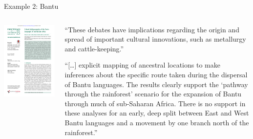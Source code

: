 \documentclass[9pt]{beamer}
\begin{document}
\begin{frame}{Example 2: Bantu}
  \begin{columns}
    \begin{column}{0.5\textwidth}
      \includegraphics[width=\textwidth,page=5,trim={5cm 11.5cm 3cm 1cm},clip]{bantu.pdf}
    \end{column}
    \begin{column}{0.5\textwidth}
      \footnotesize “These debates have implications regarding the
      origin and spread of important cultural innovations, such as
      metallurgy and cattle-keeping.”

      “[…] explicit mapping of ancestral locations to make
      inferences about the specific route taken during the dispersal
      of Bantu languages. The results clearly support the ‘pathway
      through the rainforest’ scenario for the expansion of Bantu
      through much of sub-Saharan Africa. There is no support
      in these analyses for an early, deep split between East and
      West Bantu languages and a movement by one branch
      north of the rainforest.”
    \end{column}
  \end{columns}
\end{frame}
\end{document}
